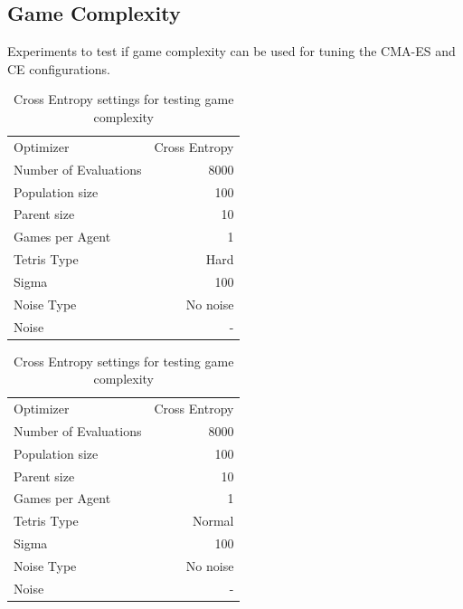 \subsection{Game Complexity \label{AppendixGameComplexity}}
Experiments to test if game complexity can be used for tuning the CMA-ES and CE configurations.

\begin{table}[h]
\centering
\begin{tabular}{l r}
Optimizer & Cross Entropy\\
Number of Evaluations & 8000\\
Population size & 100\\
Parent size & 10\\
Games per Agent & 1\\
Tetris Type & Hard\\
\hline
Sigma & 100\\
Noise Type & No noise\\
Noise & -
\end{tabular}
\quad
\begin{tabular}{l r}
Optimizer & Cross Entropy\\
Number of Evaluations & 8000\\
Population size & 100\\
Parent size & 10\\
Games per Agent & 1\\
Tetris Type & Normal\\
\hline
Sigma & 100\\
Noise Type & No noise\\
Noise & -
\end{tabular}
\caption{Cross Entropy settings for testing game complexity}
\end{table}

